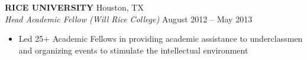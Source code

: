 \documentclass[geomargin]{res}
\begin{document}
\begin{resume}
{\bf RICE UNIVERSITY} Houston, TX \\
{\em Head Academic Fellow (Will Rice College)} \hfill
August 2012 -- May 2013 \\                                          \vspace{-4mm}
\begin{itemize}                                         \itemsep1pt %
        \item   Led 25+ Academic Fellows in providing academic assistance to underclassmen and organizing events to stimulate the intellectual environment
\end{itemize}
\vspace{-2mm}


\end{resume}
\end{document}
